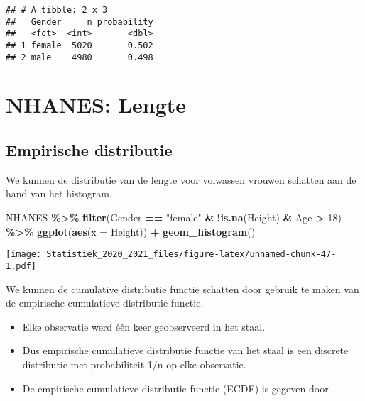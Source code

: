 \documentclass[
  12pt,dutch,coursenotes]{book}
\newenvironment{Shaded}{\begin{snugshade}}{\end{snugshade}}
\newcommand{\DataTypeTok}[1]{\textcolor[rgb]{0.13,0.29,0.53}{#1}}
\newcommand{\DecValTok}[1]{\textcolor[rgb]{0.00,0.00,0.81}{#1}}
\newcommand{\KeywordTok}[1]{\textcolor[rgb]{0.13,0.29,0.53}{\textbf{#1}}}
\newcommand{\NormalTok}[1]{#1}
\newcommand{\OperatorTok}[1]{\textcolor[rgb]{0.81,0.36,0.00}{\textbf{#1}}}
\newcommand{\StringTok}[1]{\textcolor[rgb]{0.31,0.60,0.02}{#1}}
\providecommand{\tightlist}{%
  \setlength{\itemsep}{0pt}\setlength{\parskip}{0pt}}
\theoremstyle{definition}
\theoremstyle{definition}
\theoremstyle{definition}
\theoremstyle{remark}
\begin{document}
\begin{verbatim}
## # A tibble: 2 x 3
##   Gender     n probability
##   <fct>  <int>       <dbl>
## 1 female  5020       0.502
## 2 male    4980       0.498
\end{verbatim}

\hypertarget{nhanes-lengte}{%
\section{NHANES: Lengte}\label{nhanes-lengte}}

\hypertarget{empirische-distributie}{%
\subsection{Empirische distributie}\label{empirische-distributie}}

We kunnen de distributie van de lengte voor volwassen vrouwen schatten aan de hand van het histogram.

\begin{Shaded}
\begin{Highlighting}[]
\NormalTok{NHANES }\OperatorTok{\%\textgreater{}\%}\StringTok{ }\KeywordTok{filter}\NormalTok{(Gender }\OperatorTok{==}\StringTok{ "female"} \OperatorTok{\&}\StringTok{ }\OperatorTok{!}\KeywordTok{is.na}\NormalTok{(Height) }\OperatorTok{\&}\StringTok{ }
\StringTok{    }\NormalTok{Age }\OperatorTok{\textgreater{}}\StringTok{ }\DecValTok{18}\NormalTok{) }\OperatorTok{\%\textgreater{}\%}\StringTok{ }\KeywordTok{ggplot}\NormalTok{(}\KeywordTok{aes}\NormalTok{(}\DataTypeTok{x =}\NormalTok{ Height)) }\OperatorTok{+}\StringTok{ }\KeywordTok{geom\_histogram}\NormalTok{()}
\end{Highlighting}
\end{Shaded}

\texttt{[image: Statistiek\_2020\_2021\_files/figure-latex/unnamed-chunk-47-1.pdf]}

We kunnen de cumulative distributie functie schatten door gebruik te maken van de empirische cumulatieve distributie functie.

\begin{itemize}
\tightlist
\item
  Elke observatie werd één keer geobserveerd in het staal.
\item
  Dus empirische cumulatieve distributie functie van het staal is een discrete distributie met probabiliteit 1/n op elke observatie.
\item
  De empirische cumulatieve distributie functie (ECDF) is gegeven door
\end{itemize}
\end{document}
